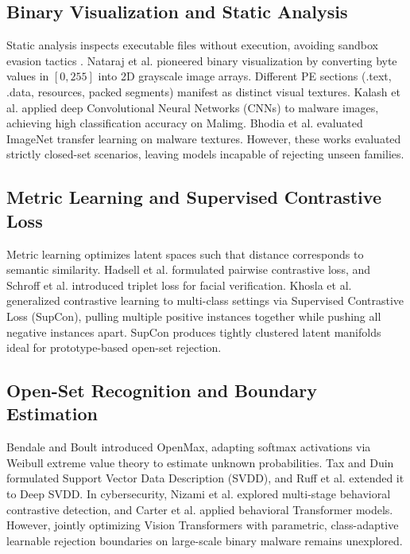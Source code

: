 \documentclass[conference]{IEEEtran}
\begin{document}
\subsection{Binary Visualization and Static Analysis}
Static analysis inspects executable files without execution, avoiding sandbox evasion tactics \cite{gibert2020}. Nataraj et al. \cite{nataraj2011} pioneered binary visualization by converting byte values in $[0, 255]$ into 2D grayscale image arrays. Different PE sections (.text, .data, resources, packed segments) manifest as distinct visual textures. Kalash et al. \cite{kalash2018} applied deep Convolutional Neural Networks (CNNs) to malware images, achieving high classification accuracy on Malimg. Bhodia et al. \cite{bhodia2019} evaluated ImageNet transfer learning on malware textures. However, these works evaluated strictly closed-set scenarios, leaving models incapable of rejecting unseen families.

\subsection{Metric Learning and Supervised Contrastive Loss}
Metric learning optimizes latent spaces such that distance corresponds to semantic similarity. Hadsell et al. \cite{hadsell2006} formulated pairwise contrastive loss, and Schroff et al. \cite{schroff2015} introduced triplet loss for facial verification. Khosla et al. \cite{khosla2020} generalized contrastive learning to multi-class settings via Supervised Contrastive Loss (SupCon), pulling multiple positive instances together while pushing all negative instances apart. SupCon produces tightly clustered latent manifolds ideal for prototype-based open-set rejection.

\subsection{Open-Set Recognition and Boundary Estimation}
Bendale and Boult \cite{bendale2016} introduced OpenMax, adapting softmax activations via Weibull extreme value theory to estimate unknown probabilities. Tax and Duin \cite{tax2004} formulated Support Vector Data Description (SVDD), and Ruff et al. \cite{ruff2018} extended it to Deep SVDD. In cybersecurity, Nizami et al. \cite{nizami2024} explored multi-stage behavioral contrastive detection, and Carter et al. \cite{carter2025} applied behavioral Transformer models. However, jointly optimizing Vision Transformers with parametric, class-adaptive learnable rejection boundaries on large-scale binary malware remains unexplored.
\end{document}
